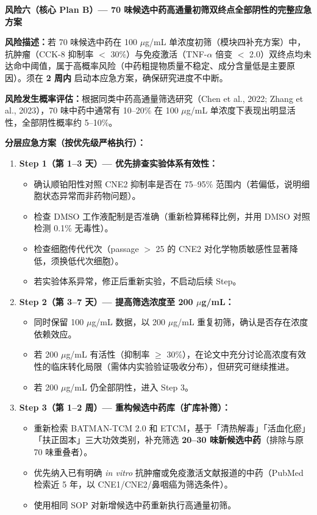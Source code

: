 \documentclass[12pt,a4paper,twoside]{article}
\begin{document}
\begin{warningbox}
\textbf{风险六（核心 Plan B）--- 70 味候选中药高通量初筛双终点全部阴性的完整应急方案}

\textbf{风险描述：}若 70 味候选中药在 100 $\mu$g/mL 单浓度初筛（模块四补充方案）中，抗肿瘤（CCK-8 抑制率 $<$ 30\%）与免疫激活（TNF-$\alpha$ 倍变 $<$ 2.0）双终点均未达命中阈值，属于高概率风险（中药粗提物质量不稳定、成分含量低是主要原因）。须在 \textbf{2 周内} 启动本应急方案，确保研究进度不中断。

\textbf{风险发生概率评估：}根据同类中药高通量筛选研究（Chen et al., 2022; Zhang et al., 2023），70 味中药中通常有 10--20\% 在 100 $\mu$g/mL 单浓度下表现出明显活性，全部阴性概率约 5--10\%。

\textbf{分层应急方案（按优先级严格执行）：}

\begin{enumerate}
  \item \textbf{Step 1（第 1--3 天）--- 优先排查实验体系有效性：}
  \begin{itemize}
    \item 确认顺铂阳性对照 CNE2 抑制率是否在 75--95\% 范围内（若偏低，说明细胞状态异常而非药物问题）。
    \item 检查 DMSO 工作液配制是否准确（重新检算稀释比例，并用 DMSO 对照检测 0.1\% 无毒性）。
    \item 检查细胞传代代次（passage $>$ 25 的 CNE2 对化学物质敏感性显著降低，须换低代次细胞）。
    \item 若实验体系异常，修正后重新实验，不启动后续 Step。
  \end{itemize}

  \item \textbf{Step 2（第 3--7 天）--- 提高筛选浓度至 200 $\mu$g/mL：}
  \begin{itemize}
    \item 同时保留 100 $\mu$g/mL 数据，以 200 $\mu$g/mL 重复初筛，确认是否存在浓度依赖效应。
    \item 若 200 $\mu$g/mL 有活性（抑制率 $\geq$ 30\%），在论文中充分讨论高浓度有效性的临床转化局限（需体内实验验证吸收分布），但研究可继续推进。
    \item 若 200 $\mu$g/mL 仍全部阴性，进入 Step 3。
  \end{itemize}

  \item \textbf{Step 3（第 1--2 周）--- 重构候选中药库（扩库补筛）：}
  \begin{itemize}
    \item 重新检索 BATMAN-TCM 2.0 和 ETCM，基于「清热解毒」「活血化瘀」「扶正固本」三大功效类别，补充筛选 \textbf{20--30 味新候选中药}（排除与原 70 味重叠者）。
    \item 优先纳入已有明确 \textit{in vitro} 抗肿瘤或免疫激活文献报道的中药（PubMed 检索近 5 年，以 CNE1/CNE2/鼻咽癌为筛选条件）。
    \item 使用相同 SOP 对新增候选中药重新执行高通量初筛。
  \end{itemize}


\end{enumerate}
\end{warningbox}
\end{document}
